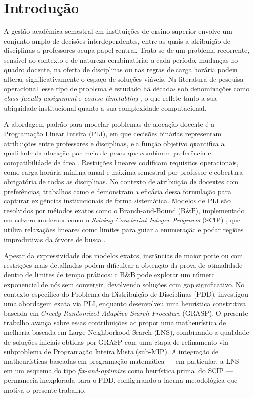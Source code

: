 \chapter{Introdução}

A gestão acadêmica semestral em instituições de ensino superior envolve um conjunto amplo de decisões interdependentes, entre as quais a atribuição de disciplinas a professores ocupa papel central. Trata-se de um problema recorrente, sensível ao contexto e de natureza combinatória: a cada período, mudanças no quadro docente, na oferta de disciplinas ou nas regras de carga horária podem alterar significativamente o espaço de soluções viáveis. Na literatura de pesquisa operacional, esse tipo de problema é estudado há décadas sob denominações como \textit{class--faculty assignment} e \textit{course timetabling} \cite{carter_laporte_1998,gunawan_ng_ong_2008}, o que reflete tanto a sua ubiquidade institucional quanto a sua complexidade computacional.

A abordagem padrão para modelar problemas de alocação docente é a Programação Linear Inteira (PLI), em que decisões binárias representam atribuições entre professores e disciplinas, e a função objetivo quantifica a qualidade da alocação por meio de pesos que combinam preferência e compatibilidade de área \cite{wolsey_2020}. Restrições lineares codificam requisitos operacionais, como carga horária mínima anual e máxima semestral por professor e cobertura obrigatória de todas as disciplinas. No contexto de atribuição de docentes com preferências, trabalhos como  e  demonstram a eficácia dessa formulação para capturar exigências institucionais de forma sistemática. Modelos de PLI são resolvidos por métodos exatos como o Branch-and-Bound (B\&B), implementado em solvers modernos como o \textit{Solving Constraint Integer Programs} (SCIP) \cite{gamrath_2020_scip}, que utiliza relaxações lineares como limites para guiar a enumeração e podar regiões improdutivas da árvore de busca \cite{vanderbei_2014}.

Apesar da expressividade dos modelos exatos, instâncias de maior porte ou com restrições mais detalhadas podem dificultar a obtenção da prova de otimalidade dentro de limites de tempo práticos: o B\&B pode explorar um número exponencial de nós sem convergir, devolvendo soluções com gap significativo. No contexto específico do Problema da Distribuição de Disciplinas (PDD),  investigou uma abordagem exata via PLI, enquanto  desenvolveu uma heurística construtiva baseada em \textit{Greedy Randomized Adaptive Search Procedure} (GRASP). O presente trabalho avança sobre essas contribuições ao propor uma matheurística de melhoria baseada em Large Neighborhood Search (LNS), combinando a qualidade de soluções iniciais obtidas por GRASP com uma etapa de refinamento via subproblema de Programação Inteira Mista (sub-MIP). A integração de matheurísticas baseadas em programação matemática --- em particular, a LNS em um esquema do tipo \textit{fix-and-optimize} como heurística primal do SCIP --- permanecia inexplorada para o PDD, configurando a lacuna metodológica que motiva o presente trabalho.

